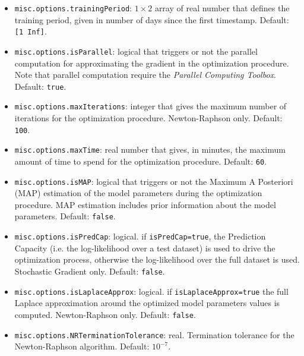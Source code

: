 \begin{itemize}
\begin{itemize}
\item \lstinline[basicstyle = \mlttfamily \small ]!misc.options.trainingPeriod!:  $1\times2$ array of real number that defines the training period, given in number of days since the first timestamp. Default: \lstinline[basicstyle = \mlttfamily \small ]![1 Inf]!. 
\item \lstinline[basicstyle = \mlttfamily \small ]!misc.options.isParallel!: logical that triggers or not the parallel computation for approximating the gradient in the optimization procedure. Note that parallel computation require the \MATLAB{} \emph{Parallel Computing Toolbox}. Default: \lstinline[basicstyle = \mlttfamily \small ]!true!.
\item \lstinline[basicstyle = \mlttfamily \small ]!misc.options.maxIterations!: integer that gives the maximum number of iterations for the optimization procedure. Newton-Raphson only. Default: \lstinline[basicstyle = \mlttfamily \small ]!100!.
\item \lstinline[basicstyle = \mlttfamily \small ]!misc.options.maxTime!: real number that gives, in minutes, the maximum amount of  time to spend for the optimization procedure. Default: \lstinline[basicstyle = \mlttfamily \small ]!60!.
\item \lstinline[basicstyle = \mlttfamily \small ]!misc.options.isMAP!: logical that triggers or not the Maximum A Posteriori (MAP) estimation of the model parameters during the optimization procedure. MAP estimation includes prior information about the model parameters. Default: \lstinline[basicstyle = \mlttfamily \small ]!false!.
\item \lstinline[basicstyle = \mlttfamily \small ]!misc.options.isPredCap!: logical.  if \lstinline[basicstyle = \mlttfamily \small ]!isPredCap=true!, the Prediction Capacity (i.e. the log-likelihood over a test dataset) is used to drive the optimization process, otherwise the log-likelihood over the full dataset is used. Stochastic Gradient only. Default: \lstinline[basicstyle = \mlttfamily \small ]!false!.
\item \lstinline[basicstyle = \mlttfamily \small ]!misc.options.isLaplaceApprox!: logical. if \lstinline[basicstyle = \mlttfamily \small ]!isLaplaceApprox=true! the full Laplace approximation around the optimized model parameters values is computed. Newton-Raphson only. Default: \lstinline[basicstyle = \mlttfamily \small ]!false!.
\item \lstinline[basicstyle = \mlttfamily \small ]!misc.options.NRTerminationTolerance!: real. Termination tolerance for the Newton-Raphson algorithm. Default: $10^{-7}$.

\end{itemize}
\end{itemize}
